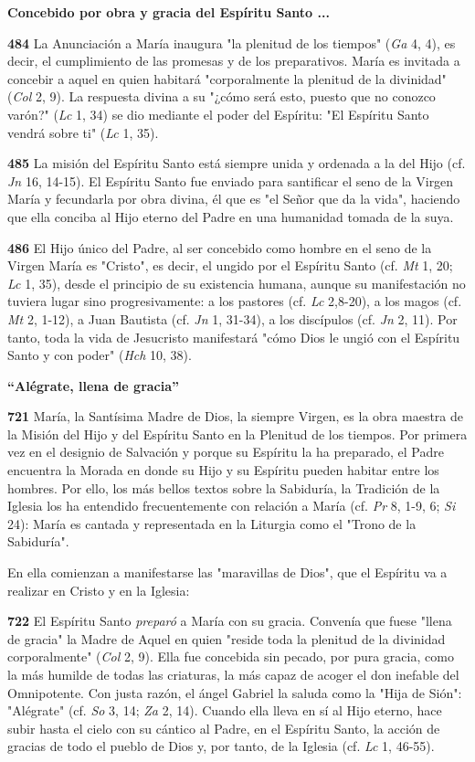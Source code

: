 \documentclass[]{article}
\begin{document}
\textbf{Concebido por obra y gracia del Espíritu Santo ...}

\textbf{484} La Anunciación a María inaugura "la plenitud de los
tiempos" (\emph{Ga} 4, 4), es decir, el cumplimiento de las promesas y
de los preparativos. María es invitada a concebir a aquel en quien
habitará "corporalmente la plenitud de la divinidad" (\emph{Col} 2, 9).
La respuesta divina a su "¿cómo será esto, puesto que no conozco varón?"
(\emph{Lc} 1, 34) se dio mediante el poder del Espíritu: "El Espíritu
Santo vendrá sobre ti" (\emph{Lc} 1, 35).

\textbf{485} La misión del Espíritu Santo está siempre unida y ordenada
a la del Hijo (cf. \emph{Jn} 16, 14-15). El Espíritu Santo fue enviado
para santificar el seno de la Virgen María y fecundarla por obra divina,
él que es "el Señor que da la vida", haciendo que ella conciba al Hijo
eterno del Padre en una humanidad tomada de la suya.

\textbf{486} El Hijo único del Padre, al ser concebido como hombre en el
seno de la Virgen María es "Cristo", es decir, el ungido por el Espíritu
Santo (cf. \emph{Mt} 1, 20; \emph{Lc} 1, 35), desde el principio de su
existencia humana, aunque su manifestación no tuviera lugar sino
progresivamente: a los pastores (cf. \emph{Lc} 2,8-20), a los magos (cf.
\emph{Mt} 2, 1-12), a Juan Bautista (cf. \emph{Jn} 1, 31-34), a los
discípulos (cf. \emph{Jn} 2, 11). Por tanto, toda la vida de Jesucristo
manifestará "cómo Dios le ungió con el Espíritu Santo y con poder"
(\emph{Hch} 10, 38).

\textbf{``Alégrate, llena de gracia''}

\textbf{721} María, la Santísima Madre de Dios, la siempre Virgen, es la
obra maestra de la Misión del Hijo y del Espíritu Santo en la Plenitud
de los tiempos. Por primera vez en el designio de Salvación y porque su
Espíritu la ha preparado, el Padre encuentra la Morada en donde su Hijo
y su Espíritu pueden habitar entre los hombres. Por ello, los más bellos
textos sobre la Sabiduría, la Tradición de la Iglesia los ha entendido
frecuentemente con relación a María (cf. \emph{Pr} 8, 1-9, 6; \emph{Si}
24): María es cantada y representada en la Liturgia como el "Trono de la
Sabiduría".

En ella comienzan a manifestarse las "maravillas de Dios", que el
Espíritu va a realizar en Cristo y en la Iglesia:

\textbf{722} El Espíritu Santo \emph{preparó} a María con su gracia.
Convenía que fuese "llena de gracia" la Madre de Aquel en quien "reside
toda la plenitud de la divinidad corporalmente" (\emph{Col} 2, 9). Ella
fue concebida sin pecado, por pura gracia, como la más humilde de todas
las criaturas, la más capaz de acoger el don inefable del Omnipotente.
Con justa razón, el ángel Gabriel la saluda como la "Hija de Sión":
"Alégrate" (cf. \emph{So} 3, 14; \emph{Za} 2, 14). Cuando ella lleva en
sí al Hijo eterno, hace subir hasta el cielo con su cántico al Padre, en
el Espíritu Santo, la acción de gracias de todo el pueblo de Dios y, por
tanto, de la Iglesia (cf. \emph{Lc} 1, 46-55).
\end{document}
